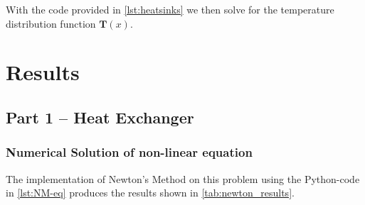 \documentclass[11pt, a4paper]{article}
\theoremstyle{definition}
\begin{document}
With the code provided in \cref{lst:heatsinks} we then solve for the temperature distribution function $ \mathbf{T}(x) $.


\section{Results}
\subsection{Part 1 -- Heat Exchanger}
\subsubsection{Numerical Solution of non-linear equation}
The implementation of Newton's Method on this problem using the Python-code in \cref{lst:NM-eq} produces the results shown in \cref{tab:newton_results}.
\end{document}
